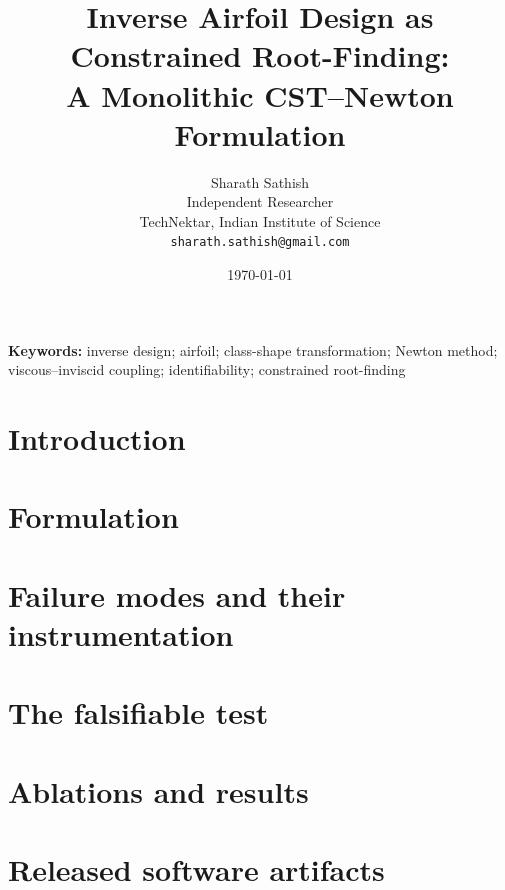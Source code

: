 \documentclass[11pt]{article}
\title{\bfseries Inverse Airfoil Design as Constrained Root-Finding:\\
A Monolithic CST--Newton Formulation}
\author{Sharath Sathish\\[3pt]
\normalsize Independent Researcher\\
\normalsize TechNektar, Indian Institute of Science\\
\normalsize \texttt{sharath.sathish@gmail.com}}
\date{\today}
\begin{document}
\maketitle

\begin{abstract}

\end{abstract}

\noindent\textbf{Keywords:} inverse design; airfoil; class-shape
transformation; Newton method; viscous--inviscid coupling; identifiability;
constrained root-finding

\section{Introduction}
\label{sec:intro}


\section{Formulation}
\label{sec:formulation}


\section{Failure modes and their instrumentation}
\label{sec:fm}


\section{The falsifiable test}
\label{sec:falsifiable}


\section{Ablations and results}
\label{sec:results}


\section{Released software artifacts}
\label{sec:artifacts}

\end{document}
